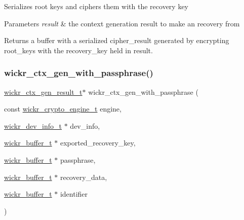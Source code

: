 Serializes root keys and ciphers them with the recovery key


\begin{DoxyParams}{Parameters}
{\em result} & the context generation result to make an recovery from \\
\hline
\end{DoxyParams}
\begin{DoxyReturn}{Returns}
a buffer with a serialized cipher\+\_\+result generated by encrypting \textquotesingle{}root\+\_\+keys\textquotesingle{} with the \textquotesingle{}recovery\+\_\+key\textquotesingle{} held in \textquotesingle{}result\textquotesingle{}. 
\end{DoxyReturn}
\mbox{\label{group__wickr__ctx_gaab0b2731d76d6ea91afd1b147c53a29a}} 
\subsubsection{\texorpdfstring{wickr\+\_\+ctx\+\_\+gen\+\_\+with\+\_\+passphrase()}{wickr\_ctx\_gen\_with\_passphrase()}}
{\footnotesize\ttfamily \mbox{\hyperlink{structwickr__ctx__gen__result}{wickr\+\_\+ctx\+\_\+gen\+\_\+result\+\_\+t}}$\ast$ wickr\+\_\+ctx\+\_\+gen\+\_\+with\+\_\+passphrase (\begin{DoxyParamCaption}\item[{const \mbox{\hyperlink{structwickr__crypto__engine}{wickr\+\_\+crypto\+\_\+engine\+\_\+t}}}]{engine,  }\item[{\mbox{\hyperlink{structwickr__dev__info}{wickr\+\_\+dev\+\_\+info\+\_\+t}} $\ast$}]{dev\+\_\+info,  }\item[{\mbox{\hyperlink{structwickr__buffer}{wickr\+\_\+buffer\+\_\+t}} $\ast$}]{exported\+\_\+recovery\+\_\+key,  }\item[{\mbox{\hyperlink{structwickr__buffer}{wickr\+\_\+buffer\+\_\+t}} $\ast$}]{passphrase,  }\item[{\mbox{\hyperlink{structwickr__buffer}{wickr\+\_\+buffer\+\_\+t}} $\ast$}]{recovery\+\_\+data,  }\item[{\mbox{\hyperlink{structwickr__buffer}{wickr\+\_\+buffer\+\_\+t}} $\ast$}]{identifier }\end{DoxyParamCaption})}

